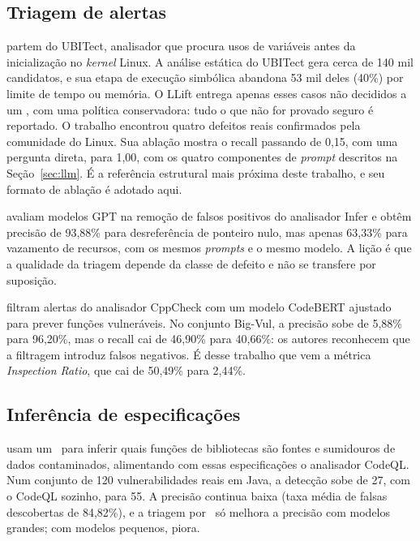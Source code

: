 \subsection{Triagem de alertas}

 partem do UBITect, analisador que procura usos de variáveis
antes da inicialização no \textit{kernel} Linux. A análise estática do UBITect
gera cerca de 140 mil candidatos, e sua etapa de execução simbólica abandona
53 mil deles (40\%) por limite de tempo ou memória. O LLift entrega apenas esses
casos não decididos a um \llm, com uma política conservadora: tudo o que não
for provado seguro é reportado. O trabalho encontrou quatro defeitos reais
confirmados pela comunidade do Linux. Sua ablação mostra o recall passando de
0,15, com uma pergunta direta, para 1,00, com os quatro componentes de
\textit{prompt} descritos na Seção~\ref{sec:llm}. É a referência estrutural
mais próxima deste trabalho, e seu formato de ablação é adotado aqui.

 avaliam modelos GPT na remoção de falsos
positivos do analisador Infer e obtêm precisão de 93,88\% para desreferência de
ponteiro nulo, mas apenas 63,33\% para vazamento de recursos, com os mesmos
\textit{prompts} e o mesmo modelo. A lição é que a qualidade da triagem depende
da classe de defeito e não se transfere por suposição.

 filtram alertas do analisador CppCheck com um modelo
CodeBERT ajustado para prever funções vulneráveis. No conjunto Big-Vul, a
precisão sobe de 5,88\% para 96,20\%, mas o recall cai de 46,90\% para
40,66\%: os autores reconhecem que a filtragem introduz falsos negativos. É
desse trabalho que vem a métrica \textit{Inspection Ratio}, que cai de
50,49\% para 2,44\%.

\subsection{Inferência de especificações}

 usam um \llm\ para inferir quais funções de bibliotecas são
fontes e sumidouros de dados contaminados, alimentando com essas
especificações o analisador CodeQL. Num conjunto de 120 vulnerabilidades reais
em Java, a detecção sobe de 27, com o CodeQL sozinho, para 55. A precisão
continua baixa (taxa média de falsas descobertas de 84,82\%), e a triagem por
\llm\ só melhora a precisão com modelos grandes; com modelos pequenos, piora.

